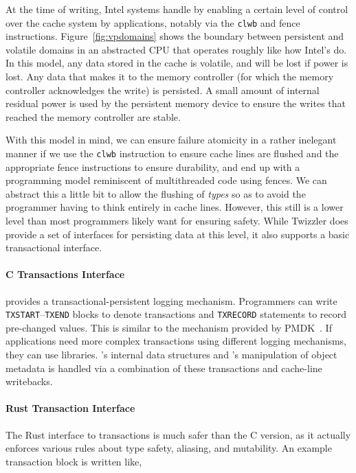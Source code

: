 At the time of writing, Intel systems handle \NVM by enabling a certain level of control over the cache system by
applications, notably via the \texttt{clwb} and fence instructions. Figure~\ref{fig:vpdomains} shows the boundary
between persistent and volatile domains in an abstracted CPU that operates roughly like how Intel's do. In this model,
any data stored in the cache is volatile, and will be lost if power is lost. Any data that makes it to the memory
controller (for which the memory controller acknowledges the write) is persisted. A small amount of internal residual
power is used by the persistent memory device to ensure the writes that reached the memory controller are stable.

With this model in mind, we can ensure failure atomicity in a rather inelegant manner if we use the \texttt{clwb}
instruction to ensure cache lines are flushed and the appropriate fence instructions to ensure durability, and end up
with a programming model reminiscent of multithreaded code using fences. We can abstract this a little bit to allow the
flushing of \emph{types} so as to avoid the programmer having to think entirely in cache lines. However, this still is a
lower level than most programmers likely want for ensuring safety. While Twizzler does provide a set of interfaces for
persisting data at this level, it also supports a basic transactional interface.


\paragraph{C Transactions Interface}
\Twizzler provides a transactional-persistent logging mechanism.
Programmers can write \texttt{TXSTART}--\texttt{TXEND} blocks to denote transactions and \texttt{TXRECORD}
statements to record pre-changed values. This is similar to the mechanism provided by
PMDK~\cite{libpmem}. If applications need more complex
transactions using different logging mechanisms, they can use libraries. \Twizzler's internal data
structures and \libcore's manipulation of object metadata is handled via a combination of these
transactions and cache-line writebacks.


\paragraph{Rust Transaction Interface}

The Rust interface to transactions is much safer than the C version, as it actually enforces various rules about type
safety, aliasing, and mutability. An example transaction block is written like,

